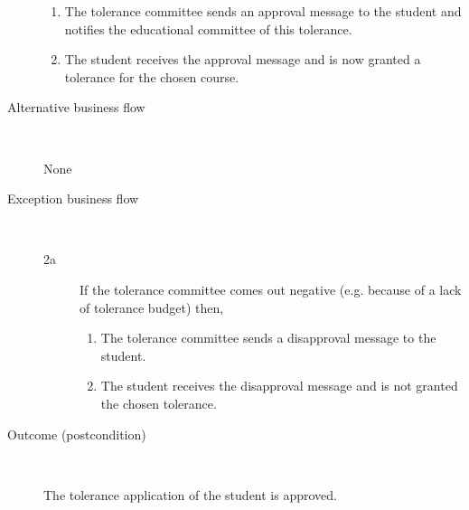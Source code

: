 \begin{description}
\begin{enumerate}
	  	\item The tolerance committee sends an approval message to the student and
	  	notifies the educational committee of this tolerance.
	  	\item The student receives the approval message and is now granted a
	  	tolerance for the chosen course.
	\end{enumerate}
	\item[Alternative business flow] \ 
		\par None
	\item[Exception business flow] \ 
	\begin{description}
		\item[2a] If the tolerance committee comes out negative (e.g. because of a
		lack of tolerance budget) then,
		\begin{enumerate}
		  \item The tolerance committee sends a disapproval message to the student.
		  \item The student receives the disapproval message and is not granted the
		  chosen tolerance.
		\end{enumerate}
	\end{description}
	\item[Outcome (postcondition)] \ 
		\par The tolerance application of the student is approved.
\end{description}
